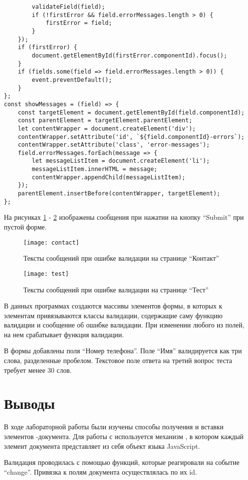 \documentclass[a4paper,14pt]{extarticle}
\begin{document}
\begin{lstlisting}
        validateField(field);
        if (!firstError && field.errorMessages.length > 0) {
            firstError = field;
        }
    });
    if (firstError) {
        document.getElementById(firstError.componentId).focus();
    }
    if (fields.some(field => field.errorMessages.length > 0)) {
        event.preventDefault();
    }
};
const showMessages = (field) => {
    const targetElement = document.getElementById(field.componentId);
    const parentElement = targetElement.parentElement;
    let contentWrapper = document.createElement('div');
    contentWrapper.setAttribute('id', `${field.componentId}-errors`);
    contentWrapper.setAttribute('class', 'error-messages');
    field.errorMessages.forEach(message => {
        let messageListItem = document.createElement('li');
        messageListItem.innerHTML = message;
        contentWrapper.appendChild(messageListItem);
    });
    parentElement.insertBefore(contentWrapper, targetElement);
};
\end{lstlisting}

На рисунках \ref{fig:contact-validation} - \ref{fig:form-validation}
изображены сообщения при нажатии на кнопку \enquote{Submit} при пустой форме.
\begin{figure}[H]
    \centering
    \texttt{[image: contact]}
    \caption{Тексты сообщений при ошибке валидации на странице \enquote{Контакт}}
    \label{fig:contact-validation}
\end{figure}
\begin{figure}[H]
    \centering
    \texttt{[image: test]}
    \caption{Тексты сообщений при ошибке валидации на странице \enquote{Тест}}
    \label{fig:form-validation}
\end{figure}

В данных программах создаются массивы элементов формы, в которых
к элементам привязываются классы валидации, содержащие саму
функцию валидации и сообщение об ошибке валидации. При изменении
любого из полей, на нем срабатывает функция валидации.

В формы добавлены поля \enquote{Номер телефона}. Поле \enquote{Имя} валидируется
как три слова, разделенные пробелом. Текстовое поле ответа на третий вопрос теста
требует менее 30 слов.

\section*{Выводы}
В ходе лабораторной работы были изучены способы получения и вставки элементов
-документа. Для работы с  используется механизм
, в котором каждый элемент документа представляет из себя объект
языка JavaScript.

Валидация проводилась с помощью функций, которые реагировали на событие
\enquote{change}. Привязка к полям документа осуществлялась по их id.
\end{document}
